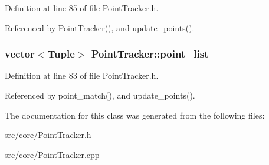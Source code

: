 \-Definition at line 85 of file \-Point\-Tracker.\-h.



\-Referenced by \-Point\-Tracker(), and update\-\_\-points().

\hypertarget{class_point_tracker_a3c396dbdf7e00c4cce3b371dd5cddd28}{
\subsubsection[{point\-\_\-list}]{\setlength{\rightskip}{0pt plus 5cm}vector$<${\bf \-Tuple}$>$ {\bf \-Point\-Tracker\-::point\-\_\-list}}}
\label{class_point_tracker_a3c396dbdf7e00c4cce3b371dd5cddd28}


\-Definition at line 83 of file \-Point\-Tracker.\-h.



\-Referenced by point\-\_\-match(), and update\-\_\-points().



\-The documentation for this class was generated from the following files\-:\begin{DoxyCompactItemize}
\item 
src/core/\hyperlink{_point_tracker_8h}{\-Point\-Tracker.\-h}\item 
src/core/\hyperlink{_point_tracker_8cpp}{\-Point\-Tracker.\-cpp}\end{DoxyCompactItemize}
